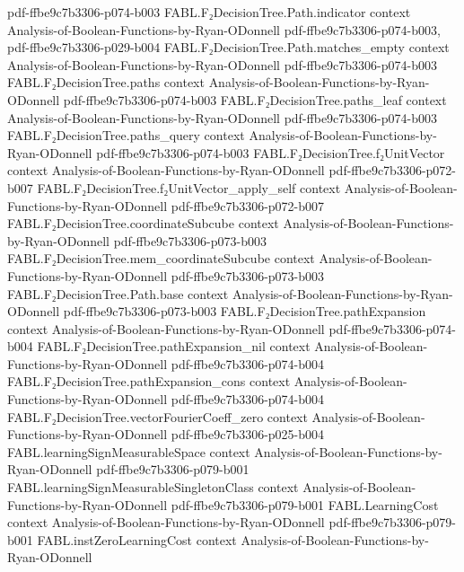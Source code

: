 \begin{theorem}
  {pdf-ffbe9c7b3306-p074-b003}
\proofstep
  {FABL.F₂DecisionTree.Path.indicator}
  {context}
  {Analysis-of-Boolean-Functions-by-Ryan-ODonnell}
  {pdf-ffbe9c7b3306-p074-b003,
    pdf-ffbe9c7b3306-p029-b004}
\proofstep
  {FABL.F₂DecisionTree.Path.matches_empty}
  {context}
  {Analysis-of-Boolean-Functions-by-Ryan-ODonnell}
  {pdf-ffbe9c7b3306-p074-b003}
\proofstep
  {FABL.F₂DecisionTree.paths}
  {context}
  {Analysis-of-Boolean-Functions-by-Ryan-ODonnell}
  {pdf-ffbe9c7b3306-p074-b003}
\proofstep
  {FABL.F₂DecisionTree.paths_leaf}
  {context}
  {Analysis-of-Boolean-Functions-by-Ryan-ODonnell}
  {pdf-ffbe9c7b3306-p074-b003}
\proofstep
  {FABL.F₂DecisionTree.paths_query}
  {context}
  {Analysis-of-Boolean-Functions-by-Ryan-ODonnell}
  {pdf-ffbe9c7b3306-p074-b003}
\proofstep
  {FABL.F₂DecisionTree.f₂UnitVector}
  {context}
  {Analysis-of-Boolean-Functions-by-Ryan-ODonnell}
  {pdf-ffbe9c7b3306-p072-b007}
\proofstep
  {FABL.F₂DecisionTree.f₂UnitVector_apply_self}
  {context}
  {Analysis-of-Boolean-Functions-by-Ryan-ODonnell}
  {pdf-ffbe9c7b3306-p072-b007}
\proofstep
  {FABL.F₂DecisionTree.coordinateSubcube}
  {context}
  {Analysis-of-Boolean-Functions-by-Ryan-ODonnell}
  {pdf-ffbe9c7b3306-p073-b003}
\proofstep
  {FABL.F₂DecisionTree.mem_coordinateSubcube}
  {context}
  {Analysis-of-Boolean-Functions-by-Ryan-ODonnell}
  {pdf-ffbe9c7b3306-p073-b003}
\proofstep
  {FABL.F₂DecisionTree.Path.base}
  {context}
  {Analysis-of-Boolean-Functions-by-Ryan-ODonnell}
  {pdf-ffbe9c7b3306-p073-b003}
\proofstep
  {FABL.F₂DecisionTree.pathExpansion}
  {context}
  {Analysis-of-Boolean-Functions-by-Ryan-ODonnell}
  {pdf-ffbe9c7b3306-p074-b004}
\proofstep
  {FABL.F₂DecisionTree.pathExpansion_nil}
  {context}
  {Analysis-of-Boolean-Functions-by-Ryan-ODonnell}
  {pdf-ffbe9c7b3306-p074-b004}
\proofstep
  {FABL.F₂DecisionTree.pathExpansion_cons}
  {context}
  {Analysis-of-Boolean-Functions-by-Ryan-ODonnell}
  {pdf-ffbe9c7b3306-p074-b004}
\proofstep
  {FABL.F₂DecisionTree.vectorFourierCoeff_zero}
  {context}
  {Analysis-of-Boolean-Functions-by-Ryan-ODonnell}
  {pdf-ffbe9c7b3306-p025-b004}
\proofstep
  {FABL.learningSignMeasurableSpace}
  {context}
  {Analysis-of-Boolean-Functions-by-Ryan-ODonnell}
  {pdf-ffbe9c7b3306-p079-b001}
\proofstep
  {FABL.learningSignMeasurableSingletonClass}
  {context}
  {Analysis-of-Boolean-Functions-by-Ryan-ODonnell}
  {pdf-ffbe9c7b3306-p079-b001}
\proofstep
  {FABL.LearningCost}
  {context}
  {Analysis-of-Boolean-Functions-by-Ryan-ODonnell}
  {pdf-ffbe9c7b3306-p079-b001}
\proofstep
  {FABL.instZeroLearningCost}
  {context}
  {Analysis-of-Boolean-Functions-by-Ryan-ODonnell}

\end{theorem}
